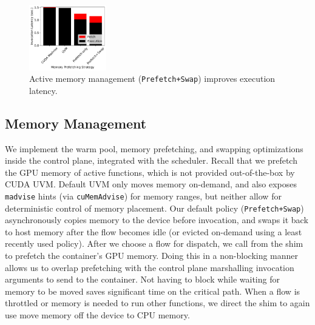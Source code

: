 \begin{figure}
  \includegraphics[width=0.3\textwidth]{../graphs/mem-move/f16-i20-driver-mps-move.pdf}
  \vspace*{\captionspace}
  \caption{Active memory management (\texttt{Prefetch+Swap}) improves execution latency.}
  \vspace{-0.3cm}
  \label{fig:mem-prefetch}
\end{figure}

\subsection{Memory Management}

We implement the warm pool, memory prefetching, and swapping optimizations inside the control plane, integrated with the scheduler. 
Recall that we prefetch the GPU memory of active functions, which is not provided out-of-the-box by CUDA UVM. 
Default UVM only moves memory on-demand, and also exposes \texttt{madvise} hints (via \texttt{cuMemAdvise}) for memory ranges, but neither allow for deterministic control of memory placement.
Our default policy (\texttt{Prefetch+Swap}) asynchronously copies memory to the device before invocation, and swaps it back to host memory after the flow becomes idle (or evicted on-demand using a least recently used policy). 
After we choose a flow for dispatch, we call  from the shim to prefetch the container's GPU memory.
Doing this in a non-blocking manner allows us to overlap prefetching with the control plane marshalling invocation arguments to send to the container. 
Not having to block while waiting for memory to be moved saves significant time on the critical path.
When a flow is throttled or memory is needed to run other functions, we direct the shim to again use  move memory off the device to CPU memory. 


